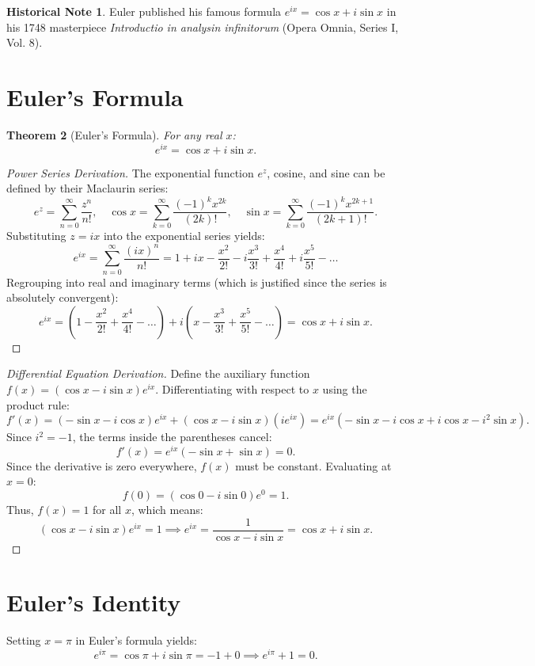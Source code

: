 \documentclass[11pt,a4paper,twoside]{book}
\theoremstyle{eulerstyle}
\newtheorem{theorem}{Theorem}[chapter]
\theoremstyle{definition}
\newtheorem{historical}[theorem]{Historical Note}
\begin{document}
\begin{historical}
Euler published his famous formula $e^{ix} = \cos x + i \sin x$ in his 1748 masterpiece \emph{Introductio in analysin infinitorum} (Opera Omnia, Series I, Vol. 8). \cite{euler1748}\end{historical}

\section{Euler's Formula}
\begin{theorem}[Euler's Formula]
For any real $x$:
\[
e^{ix} = \cos x + i \sin x.
\]
\end{theorem}

\begin{proof}[Power Series Derivation]
The exponential function $e^z$, cosine, and sine can be defined by their Maclaurin series:
\[
e^z = \sum_{n=0}^\infty \frac{z^n}{n!}, \quad \cos x = \sum_{k=0}^\infty \frac{(-1)^k x^{2k}}{(2k)!}, \quad \sin x = \sum_{k=0}^\infty \frac{(-1)^k x^{2k+1}}{(2k+1)!}.
\]
Substituting $z = ix$ into the exponential series yields:
\[
e^{ix} = \sum_{n=0}^\infty \frac{(ix)^n}{n!} = 1 + ix - \frac{x^2}{2!} - i\frac{x^3}{3!} + \frac{x^4}{4!} + i\frac{x^5}{5!} - \dots
\]
Regrouping into real and imaginary terms (which is justified since the series is absolutely convergent):
\[
e^{ix} = \left( 1 - \frac{x^2}{2!} + \frac{x^4}{4!} - \dots \right) + i \left( x - \frac{x^3}{3!} + \frac{x^5}{5!} - \dots \right) = \cos x + i \sin x.
\]
\end{proof}

\begin{proof}[Differential Equation Derivation]
Define the auxiliary function $f(x) = (\cos x - i \sin x)e^{ix}$. Differentiating with respect to $x$ using the product rule:
\[
f'(x) = (-\sin x - i \cos x)e^{ix} + (\cos x - i \sin x)(i e^{ix}) = e^{ix} \left( -\sin x - i\cos x + i\cos x - i^2\sin x \right).
\]
Since $i^2 = -1$, the terms inside the parentheses cancel:
\[
f'(x) = e^{ix} \left( -\sin x + \sin x \right) = 0.
\]
Since the derivative is zero everywhere, $f(x)$ must be constant. Evaluating at $x = 0$:
\[
f(0) = (\cos 0 - i \sin 0)e^{0} = 1.
\]
Thus, $f(x) = 1$ for all $x$, which means:
\[
(\cos x - i \sin x)e^{ix} = 1 \implies e^{ix} = \frac{1}{\cos x - i \sin x} = \cos x + i \sin x.
\]
\end{proof}

\section{Euler's Identity}
Setting $x = \pi$ in Euler's formula yields:
\[
e^{i\pi} = \cos\pi + i\sin\pi = -1 + 0 \implies e^{i\pi} + 1 = 0.
\]
\end{document}
